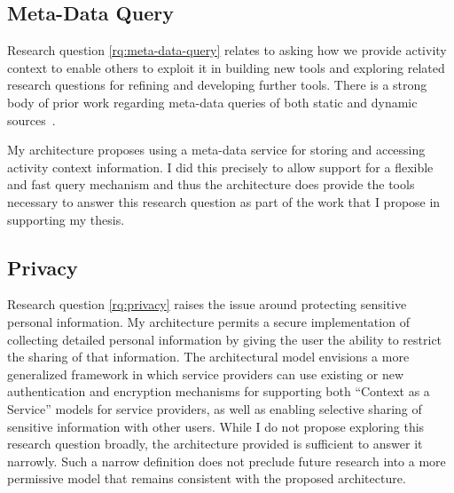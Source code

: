 \subsection{Meta-Data Query}
\label{ch:architecture:sec:rq:subsec:meta-data-query}

Research question \ref{rq:meta-data-query} relates to asking how we provide
activity context to enable others to exploit it in building new tools and
exploring related research questions for refining and developing further tools.
There is a strong body of prior work regarding meta-data queries of both static
and dynamic
sources~\cite{Strong,revol2011universal,smartstore,pindex,federatedMetaData,huo2016mbfs,Suguna2015,Parker-Wood2014,watson2017exploring,leung2009magellan,leung2009spyglass,niazi2017hopsfs,van2011efficient}.

My architecture proposes using a meta-data service for storing and accessing
activity context information.  I did this precisely to allow support for a
flexible and fast query mechanism and thus the architecture does provide the
tools necessary to answer this research question as part of the work that I
propose in supporting my thesis.

\subsection{Privacy}

Research question \ref{rq:privacy} raises the issue around protecting sensitive
personal information.  My architecture permits a secure implementation of collecting detailed personal
information by giving the user the ability to restrict the sharing of that
information.  The architectural model envisions a more generalized framework in
which service providers can use existing or new authentication and encryption
mechanisms for supporting both ``Context as a Service'' models for service
providers, as well as enabling selective sharing of sensitive information with
other users.  While I do not propose exploring this research question broadly,
the architecture provided is sufficient to answer it narrowly.  Such a narrow
definition does not preclude future research into a more permissive model that
remains consistent with the proposed architecture.


